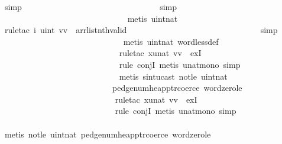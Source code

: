 \begin{isabellebody}
\ simp\ \isanewline
\ \ \ \ \ \ \ \ \ \ \ \ \ \ \ \ \ \ \ \ \ \ \ \ \ \ \ \ \ \ \isamarkupfalse%
\ simp\isanewline
\ \ \ \ \ \ \ \ \ \ \ \ \ \ \ \ \ \ \ \ \ \ \ \ \ \ \ \ \ \isamarkupfalse%
\ {\isacharparenleft}metis\ uint{\isacharunderscore}nat{\isacharparenright}\isanewline
\ \ \ \ \ \ \ \ \ \ \ \ \ \ \ \ \ \ \ \ \ \ \ \ \ \ \ \ \isamarkupfalse%
\ {\isacharparenleft}rule{\isacharunderscore}tac\ i{\isacharequal}{\isachardoublequoteopen}\ {\isacharparenleft}uint\ vv{\isacharparenright}{\isachardoublequoteclose}\ \ arrlist{\isacharunderscore}nth{\isacharunderscore}valid{\isacharparenright}\isanewline
\ \ \ \ \ \ \ \ \ \ \ \ \ \ \ \ \ \ \ \ \ \ \ \ \ \ \ \ \ \ \isamarkupfalse%
\ simp{\isacharplus}\isanewline
\ \ \ \ \ \ \ \ \ \ \ \ \ \ \ \ \ \ \ \ \ \ \ \ \ \ \ \ \isamarkupfalse%
\ {\isacharparenleft}metis\ uint{\isacharunderscore}nat\ word{\isacharunderscore}less{\isacharunderscore}def{\isacharparenright}\isanewline
\ \ \ \ \ \ \ \ \ \ \ \ \ \ \ \ \ \ \ \ \ \ \ \ \ \ \ \isamarkupfalse%
\ {\isacharparenleft}rule{\isacharunderscore}tac\ x{\isacharequal}{\isachardoublequoteopen}unat\ vv{\isachardoublequoteclose}\ \ exI{\isacharparenright}\ \isanewline
\ \ \ \ \ \ \ \ \ \ \ \ \ \ \ \ \ \ \ \ \ \ \ \ \ \ \ \isamarkupfalse%
\ {\isacharparenleft}rule\ conjI{\isacharcomma}\ metis\ unat{\isacharunderscore}mono{\isacharcomma}\ simp{\isacharparenright}\isanewline
\ \ \ \ \ \ \ \ \ \ \ \ \ \ \ \ \ \ \ \ \ \ \ \ \ \ \ \isamarkupfalse%
\ {\isacharparenleft}metis\ sint{\isacharunderscore}ucast\ not{\isacharunderscore}le\ uint{\isacharunderscore}nat\ \isanewline
\ \ \ \ \ \ \ \ \ \ \ \ \ \ \ \ \ \ \ \ \ \ \ \ \ \ \ pedge{\isacharunderscore}num{\isacharunderscore}heap{\isacharunderscore}ptr{\isacharunderscore}coerce\ word{\isacharunderscore}zero{\isacharunderscore}le{\isacharparenright}\isanewline
\ \ \ \ \ \ \ \ \ \ \ \ \ \ \ \ \ \ \ \ \ \ \ \ \ \ \isamarkupfalse%
\ {\isacharparenleft}rule{\isacharunderscore}tac\ x{\isacharequal}{\isachardoublequoteopen}unat\ vv{\isachardoublequoteclose}\ \ exI{\isacharparenright}\ \isanewline
\ \ \ \ \ \ \ \ \ \ \ \ \ \ \ \ \ \ \ \ \ \ \ \ \ \ \isamarkupfalse%
\ {\isacharparenleft}rule\ conjI{\isacharcomma}\ metis\ unat{\isacharunderscore}mono{\isacharcomma}\ simp{\isacharparenright}\isanewline
\ \ \ \ \ \ \ \ \ \ \ \ \ \ \ \ \ \ \ \ \ \ \ \ \ \ \isamarkupfalse%
\ {\isacharparenleft}metis\ not{\isacharunderscore}le\ uint{\isacharunderscore}nat\ pedge{\isacharunderscore}num{\isacharunderscore}heap{\isacharunderscore}ptr{\isacharunderscore}coerce\ word{\isacharunderscore}zero{\isacharunderscore}le{\isacharparenright}\isanewline

\end{isabellebody}
